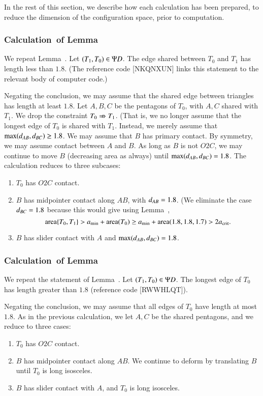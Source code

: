 In the rest of this section, we describe how each calculation has been
prepared, to reduce the dimension of the configuration space, prior to
computation.

\subsubsection{Calculation~of Lemma~} 

We repeat Lemma~.  Let $(T_1,T_0)\in \Psi D$.  The edge
shared between $T_0$ and $T_1$ has length less than $1.8$.  (The
reference code [NKQNXUN] links this statement to the relevant body of
computer code.)

Negating the conclusion, we may assume that the shared edge between
triangles has length at least $1.8$.  Let $A,B,C$ be the pentagons of
$T_0$, with $A,C$ shared with $T_1$.  We drop the constraint $T_0\nRightarrow
T_1$.  (That is, we no longer assume that the longest edge of $T_0$ is
shared with $T_1$.  Instead, we merely assume that
$\max(d_{AB},d_{BC})\ge 1.8$.  We may assume that $B$ has primary
contact. By symmetry, we may assume contact between $A$ and $B$.  As
long as $B$ is not $O2C$, we may continue to move $B$ (decreasing area
as always) until $\max(d_{AB},d_{BC})=1.8$.  The calculation reduces
to three subcases:
\begin{enumerate}
\item $T_0$ has $O2C$ contact.
\item $B$ has midpointer contact along $AB$, with $d_{AB}=1.8$.  (We
  eliminate the case $d_{BC}=1.8$ because this would give using
  Lemma~,
\[
{\operatorname{area}}\{T_0,T_1\} > a_\text{min} + {\operatorname{area}}(T_0) \ge a_\text{min} + {\operatorname{area}}(1.8,1.8,1.7) > 2a_\text{crit}.
\]
\item $B$ has slider contact with $A$ and $\max(d_{AB},d_{BC})=1.8$.
\end{enumerate}

\subsubsection{Calculation~of Lemma~} 

We repeat the statement of Lemma~.
Let $(T_1,T_0)\in \Psi D$.  The longest edge of $T_0$
has length greater than $1.8$ (reference code [RWWHLQT]).


Negating the conclusion, we may assume that all edges of $T_0$ have
length at most $1.8$.  As in the previous calculation, we let $A,C$ be
the shared pentagons, and we reduce to three cases:
\begin{enumerate}
\item $T_0$ has $O2C$ contact.
\item $B$ has midpointer contact along $AB$.  We continue to deform by
  translating $B$ until $T_0$ is long isosceles.
\item $B$ has slider contact with $A$, and $T_0$ is long isosceles.
\end{enumerate}

